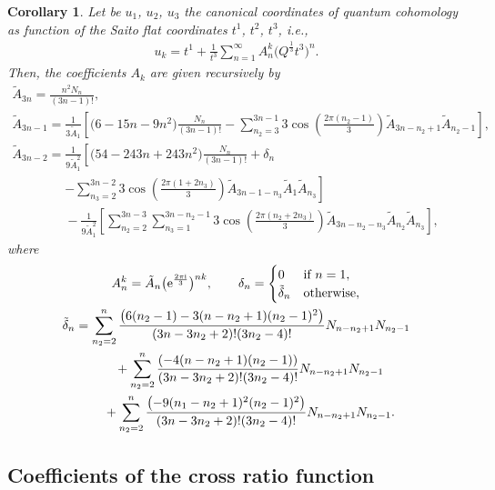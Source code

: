 \documentclass[11pt]{article}
\numberwithin{equation}{section}
\numberwithin{equation}{section}
\newtheorem{Corollary}[Theorem]{Corollary}
\begin{document}
\begin{Corollary}
Let be $u_1$, $u_2$, $u_3$ the canonical coordinates of quantum cohomology as function of the Saito flat coordinates $t^1$, $t^2$, $t^3$, i.e.,
\begin{gather*}%
u_k=t^1+\frac{1}{t^3}\sum_{n=1}^{\infty} A_n^k \bigl( Q^{\frac{1}{3}}t^3 \bigr)^n.
\end{gather*}
Then, the coefficients $A_{k}$ are given recursively by
\begin{gather*}
\tilde A_{3n}=\frac{n^2N_n}{(3n-1)! },\\
 \tilde A_{3n-1}=\frac{1}{3 \tilde A_{1}}\left[\bigl(6-15n-9n^2 \bigr)\frac{N_n}{(3n-1)!}-\sum_{n_2=3}^{3n-1}3\cos\left( \frac{2\pi (n_2-1)}{3}\right) \tilde A_{3n-n_2+1} \tilde A_{n_2-1}\right],\\
 \tilde A_{3n-2}=\frac{1}{9\tilde A_1^2}\left[\bigl(54-243n +243n^2\bigr)\frac{N_n}{(3n-1)!}+\delta_{n} \right.\\
 \phantom{ \tilde A_{3n-2}=}{}\left.-\sum_{n_3=2}^{3n-2}3\cos\left( \frac{2\pi (1+2n_3 )}{3} \right) \tilde A_{3n-1-n_3} \tilde A_{1} \tilde A_{n_3}\right]\\
\phantom{ \tilde A_{3n-2}=}{}-\frac{1}{9\tilde A_1^2}\left[\sum_{n_2=2}^{3n-3}\sum_{n_3=1}^{3n-n_2-1}3\cos\left( \frac{2\pi (n_2+2n_3 )}{3} \right) \tilde A_{3n-n_2-n_3} \tilde A_{n_2} \tilde A_{n_3}\right],
\end{gather*}
where
\begin{gather*}
A_n^k=\tilde A_n \bigl( {\rm e}^{\frac{2\pi {\rm i}}{3}}\bigr)^{nk}
,\qquad
\delta_n=
\begin{cases}
0& \text{if } n=1,\\
 \tilde\delta_n & \text{otherwise},
\end{cases}
\\
\tilde\delta_n=\sum_{n_2=2}^{n}\frac{\bigl(6(n_2-1)-3(n-n_2+1)(n_2-1)^2 \bigr)}{(3n-3n_2+2)!(3n_2-4)!} N_{n-n_2+1}N_{n_2-1}\\
\phantom{\tilde\delta_n=}{}+\sum_{n_2=2}^{n}\frac{(-4(n-n_2+1)(n_2-1) )}{(3n-3n_2+2)!(3n_2-4)!} N_{n-n_2+1}N_{n_2-1}\\
\phantom{\tilde\delta_n=}{}+\sum_{n_2=2}^{n}\frac{\bigl(-9(n_1-n_2+1)^2(n_2-1)^2 \bigr)}{(3n-3n_2+2)!(3n_2-4)!} N_{n-n_2+1}N_{n_2-1}.
\end{gather*}
\end{Corollary}

\subsection{Coefficients of the cross ratio function}\label{Coefficients of the cross ratio function}
\end{document}
